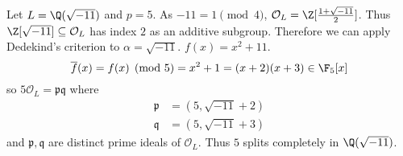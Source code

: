 \documentclass[a4paper]{article}
\renewcommand*{\O}{\mathcal{O}}
\newcommand*{\red}[1]{\overline{#1}}%
\begin{document}
\begin{eg}
  Let \(L = \Q(\sqrt{-11})\) and \(p = 5\). As \(-11 = 1 \pmod 4\), \(\O_L = \Z[\frac{1 + \sqrt{-11}}{2}]\). Thus \(\Z[\sqrt{-11}] \subseteq \O_L\) has index \(2\) as an additive subgroup. Therefore we can apply Dedekind's criterion to \(\alpha = \sqrt{-11}\). \(f(x) = x^2 + 11\).
  \[
    \red f(x) = f(x) \pmod 5 = x^2 + 1 = (x + 2)(x + 3) \in \F_5[x]
  \]
  so \(5\O_L = \mathfrak p \mathfrak q\) where
  \begin{align*}
    \mathfrak p &= (5, \sqrt{-11} + 2) \\
    \mathfrak q &= (5, \sqrt{-11} + 3)
  \end{align*}
  and \(\mathfrak p, \mathfrak q\) are distinct prime ideals of \(\O_L\). Thus \(5\) splits completely in \(\Q(\sqrt{-11})\).
\end{eg}
\end{document}
